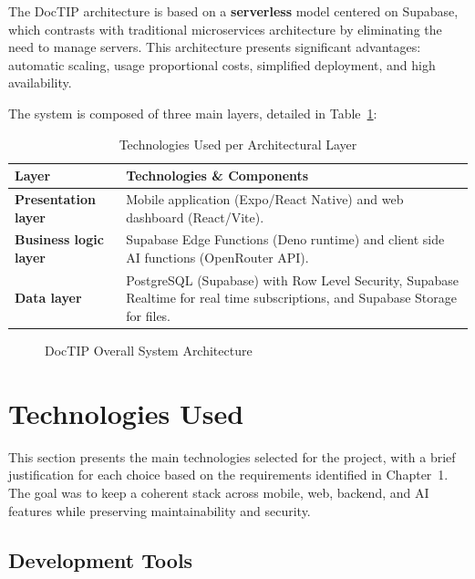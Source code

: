 \documentclass[12pt,a4paper,oneside]{report}
\begin{document}
The DocTIP architecture is based on a \textbf{serverless} model centered on Supabase, which contrasts with traditional microservices architecture by eliminating the need to manage servers. This architecture presents significant advantages: automatic scaling, usage proportional costs, simplified deployment, and high availability.

The system is composed of three main layers, detailed in Table~\ref{tab:arch layers}:

\begin{table}[H]
\centering
\caption{Technologies Used per Architectural Layer}
\label{tab:arch layers}
\small
\begin{tabular}{|l|p{10cm}|}
\hline
\textbf{Layer} & \textbf{Technologies \& Components} \\
\hline
\textbf{Presentation layer} & Mobile application (Expo/React Native) and web dashboard (React/Vite). \\
\hline
\textbf{Business logic layer} & Supabase Edge Functions (Deno runtime) and client side AI functions (OpenRouter API). \\
\hline
\textbf{Data layer} & PostgreSQL (Supabase) with Row Level Security, Supabase Realtime for real time subscriptions, and Supabase Storage for files. \\
\hline
\end{tabular}
\end{table}

\begin{figure}[H]
    \centering
    \resizebox{0.96\textwidth}{!}{}
    \caption{DocTIP Overall System Architecture}
    \label{fig:architecture}
\end{figure}


\section{Technologies Used}

This section presents the main technologies selected for the project, with a brief justification for each choice based on the requirements identified in Chapter~1. The goal was to keep a coherent stack across mobile, web, backend, and AI features while preserving maintainability and security.

\subsection{Development Tools}
\end{document}
